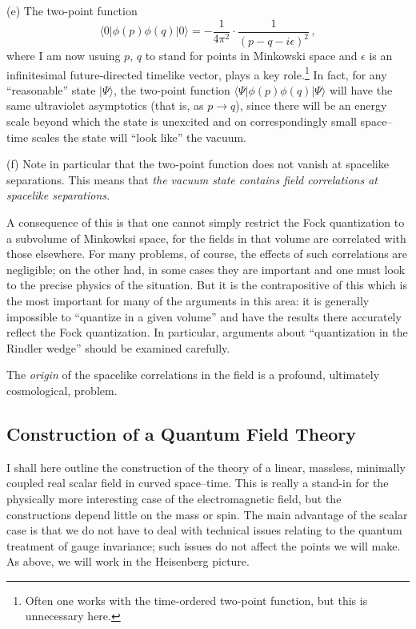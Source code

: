 \documentclass[12pt]{article}
\begin{document}
(e) The two-point function
\begin{equation}\label{twopoint}
\langle 0|\phi (p)\phi (q)|0\rangle =
  -\frac{1}{4\pi ^2}\cdot\frac{1}{(p-q-i\epsilon )^2}
     \, ,
\end{equation}
where I am now usuing $p$, $q$ to stand for points in Minkowski space and $\epsilon$ is an infinitesimal future-directed timelike vector, plays a key role.\footnote{Often one works with the time-ordered two-point function, but this is unnecessary here.} In fact, for any ``reasonable'' state $|\Psi\rangle$, the two-point function $\langle\Psi |\phi (p)\phi (q)|\Psi\rangle$ will have the same ultraviolet asymptotics (that is, as $p\to q$), since there will be an energy scale beyond which the state is unexcited and on correspondingly small space--time scales the state will ``look like'' the vacuum.

(f) Note in particular that the two-point function 
does not vanish at spacelike separations.  This means that {\em the vacuum state contains field correlations at spacelike separations.}



A consequence of this is
that one cannot simply restrict the Fock quantization to a subvolume of Minkowksi space, for the fields in that volume are correlated with those elsewhere.  For many problems, of course, the effects of such correlations are negligible; on the other had, in some cases they are important and one must look to the precise physics of the situation.  
But it is the contrapositive of this which is the most important for many of the arguments in this area:  it is generally impossible to ``quantize in a given volume''  and have the results there accurately reflect the Fock quantization.  In particular, arguments about ``quantization in the Rindler wedge'' should be examined carefully.

The {\em origin} of the spacelike correlations in the field is a profound, ultimately cosmological, problem.



\subsection{Construction of a Quantum Field Theory}

I shall here outline the construction of the theory of a linear, massless, minimally coupled real scalar field in curved space--time. 
This is really a stand-in for the physically more interesting case of the electromagnetic field, but the constructions depend little on the mass or spin.  The main advantage of the scalar case is that we do not have to deal with technical issues relating to the quantum treatment of gauge invariance; such issues do not affect the points we will make.
As above, we will work in the Heisenberg picture.
\end{document}
